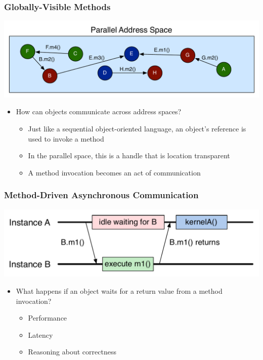 \begin{frame}[fragile]
  \frametitle{Globally-Visible Methods}
  \begin{center}
    \includegraphics[width=\textwidth]{figures/objectMethodGlobalAddress.pdf}
  \end{center}
  \begin{itemize}
    \item How can objects communicate across address spaces?
      \begin{itemize}
      \item Just like a sequential object-oriented language, an object's
        reference is used to invoke a method
      \item In the parallel space, this is a handle that is location
          transparent
      \item A method invocation becomes an act of communication
      \end{itemize}
  \end{itemize}
\end{frame}

\begin{frame}[fragile]
  \frametitle{Method-Driven Asynchronous Communication}
  \begin{center}
    \includegraphics[width=\textwidth]{figures/objectSequence.pdf}
  \end{center}
  \begin{itemize}
  \item What happens if an object waits for a return value from a method
    invocation?
    \begin{itemize}
    \item Performance
    \item Latency
    \item Reasoning about correctness
    \end{itemize}
  \end{itemize}
\end{frame}

